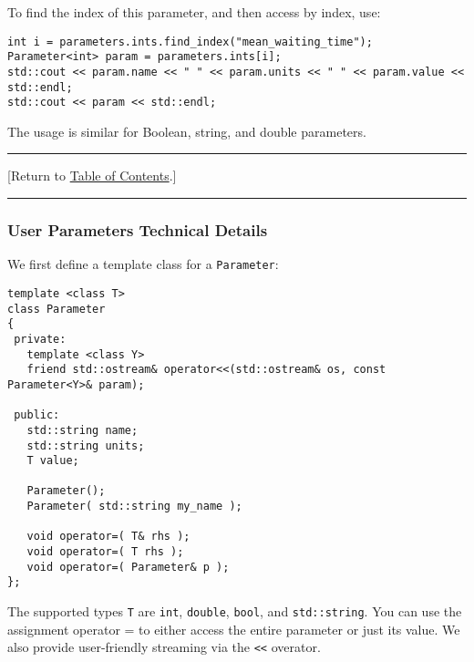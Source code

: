 \documentclass[12pt]{article}
\renewcommand{\v}{\verb}
\newcommand{\TOClink}{\begin{center}\hrule\vskip-5pt\phantom{.}\hfill[Return to \hyperlink{TOC}{Table of Contents}.]\hfill\phantom{.}\vskip3pt\hrule\end{center}}
\begin{document}
To find the index of this parameter, and then access by index, use: 

\begin{verbatim}
int i = parameters.ints.find_index("mean_waiting_time");
Parameter<int> param = parameters.ints[i]; 
std::cout << param.name << " " << param.units << " " << param.value << std::endl; 
std::cout << param << std::endl; 
\end{verbatim}

The usage is similar for Boolean, string, and double parameters. 

\TOClink


\subsubsection{User Parameters Technical Details}
\label{sec:XML_user_parameters_data_types}
We first define a template class for a \v|Parameter|: 
\begin{verbatim}
template <class T> 
class Parameter
{
 private:
   template <class Y>
   friend std::ostream& operator<<(std::ostream& os, const Parameter<Y>& param); 

 public: 
   std::string name; 
   std::string units; 
   T value; 
   
   Parameter();
   Parameter( std::string my_name ); 
   
   void operator=( T& rhs ); 
   void operator=( T rhs ); 
   void operator=( Parameter& p ); 
};
\end{verbatim} 
The supported types \v|T| are \v|int|, \v|double|, \v|bool|, and \v|std::string|. You can use 
the assignment operator = to either access the entire parameter or just its value. 
We also provide user-friendly streaming via the \v|<<| overator. 
\end{document}
